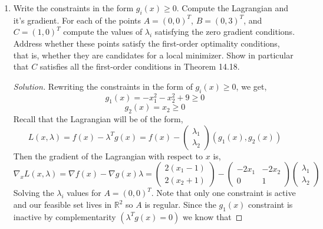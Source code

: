 \documentclass[12pt]{article}
\makeatletter
\theoremstyle{homework}
\newenvironment{exercise}[1]
{\def\@currentlabel{#1}\exercisecore}
{\endexercisecore}
\newcommand{\Reals}{\ensuremath{\mathbb R}}
\let\RR\Reals
\makeatother
\begin{document}
\begin{exercise}{P22}
\begin{enumerate}
    \item[(b)] Write the constraints in the form $g_i(x) \geq 0$. Compute the Lagrangian and it's gradient. 
    For each of the points $A = (0, 0)^T$, $B = (0, 3)^T$, and $C = (1, 0)^T$ compute the values of $\lambda_i$
    satisfying the zero gradient conditions. Address whether these points satisfy the first-order optimality conditions, 
    that is, whether they are candidates for a local minimizer. Show in particular that $C$ satisfies all the first-order conditions in
    Theorem 14.18. 
    \begin{proof}[Solution] Rewriting the constraints in the form of  $g_i(x) \geq 0$, we get, 
      \begin{equation*}
       g_1(x) =  -x_1^2 - x_2^2 + 9 \geq 0
      \end{equation*}
      \begin{equation*}
        g_2(x) = x_2 \geq 0
      \end{equation*}
      Recall that the Lagrangian will be of the form, 
      \begin{equation*}
        L(x, \lambda) = f(x) - \lambda^Tg(x) = f(x) - \begin{pmatrix}
          \lambda_1\\
          \lambda_2
        \end{pmatrix}
        \left(g_1(x), g_2(x)\right)
      \end{equation*}
      Then the gradient of the Lagrangian with respect to $x$ is, 
      \begin{equation*}
        \nabla_x L(x, \lambda) = \nabla f(x) - \nabla g(x)\lambda = \begin{pmatrix}
          2(x_1 - 1)\\
          2(x_2 + 1)
        \end{pmatrix}
         - 
         \begin{pmatrix}
          -2x_1 & -2x_2\\
          0 & 1
         \end{pmatrix}
         \begin{pmatrix}
          \lambda_1\\
          \lambda_2
         \end{pmatrix}
      \end{equation*}
      Solving the $\lambda_i$ values for $A = (0, 0)^T$. Note that only one constraint is active and our feasible set lives in $\RR^2$ so $A$ is regular. Since the $g_1(x)$ constraint is inactive by complementarity $(\lambda^Tg(x) = 0)$ we know that 

\end{proof}
\end{enumerate}
\end{exercise}
\end{document}
